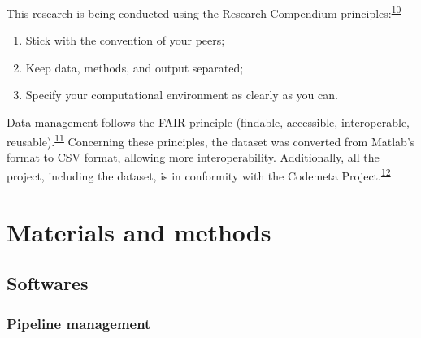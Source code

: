 \documentclass[12pt,twoside]{fmupthesis}
\providecommand{\tightlist}{%
  \setlength{\itemsep}{0pt}\setlength{\parskip}{0pt}}
\begin{document}
This research is being conducted using the Research Compendium principles:\textsuperscript{\protect\hyperlink{ref-compendium2019}{10}}
\begin{enumerate}
\def\labelenumi{\arabic{enumi}.}
\tightlist
\item
  Stick with the convention of your peers;
\item
  Keep data, methods, and output separated;
\item
  Specify your computational environment as clearly as you can.
\end{enumerate}
Data management follows the FAIR principle (findable, accessible, interoperable, reusable).\textsuperscript{\protect\hyperlink{ref-wilkinson2016}{11}} Concerning these principles, the dataset was converted from Matlab's format to
CSV format, allowing more interoperability. Additionally, all the project, including the dataset, is
in conformity with the Codemeta Project.\textsuperscript{\protect\hyperlink{ref-CodeMeta2017}{12}}

\hypertarget{materials-and-methods}{%
\chapter{Materials and methods}\label{materials-and-methods}}

\hypertarget{softwares}{%
\section{Softwares}\label{softwares}}

\hypertarget{pipeline-management}{%
\subsection{Pipeline management}\label{pipeline-management}}
\end{document}

